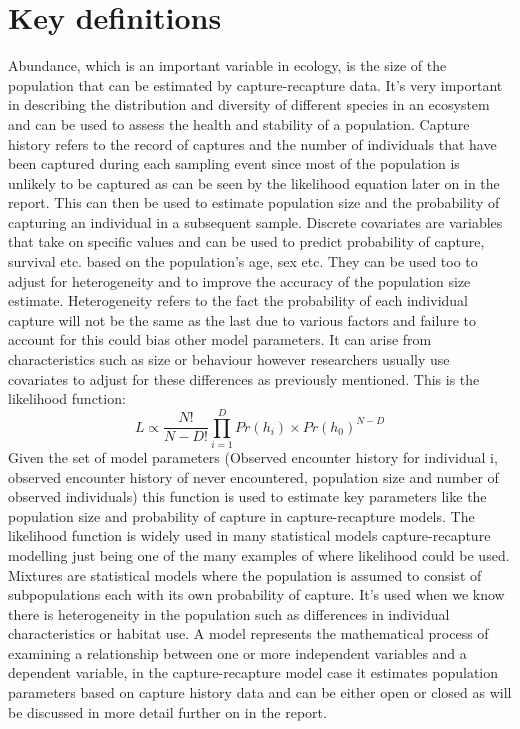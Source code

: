 \documentclass[,oneside]{article}
\numberwithin{equation}{section}
\begin{document}
\section{\large{Key definitions}} 
Abundance, which is an important variable in ecology, is the size of the population that can be estimated by capture-recapture data. It’s very important in describing the distribution and diversity of different species in an ecosystem and can be used to assess the health and stability of a population. Capture history refers to the record of captures and the number of individuals that have been captured during each sampling event since most of the population is unlikely to be captured as can be seen by the likelihood equation later on in the report. This can then be used to estimate population size and the probability of capturing an individual in a subsequent sample. Discrete covariates are variables that take on specific values and can be used to predict probability of capture, survival etc. based on the population's age, sex etc. They can be used too to adjust for heterogeneity and to improve the accuracy of the population size estimate. Heterogeneity refers to the fact the probability of each individual capture will not be the same as the last due to various factors and failure to account for this could bias other model parameters. It can arise from characteristics such as size or behaviour however researchers usually use covariates to adjust for these differences as previously mentioned. This is the likelihood function: \\
\begin{equation}
L\propto\frac{N!}{N-D!}\prod_{i=1}^{D}Pr(h_i)\times Pr(h_0)^{N-D}
\end{equation} 
Given the set of model parameters (Observed encounter history for individual i, observed encounter history of never encountered, population size and number of observed individuals) this function is used to estimate key parameters like the population size and probability of capture in capture-recapture models. The likelihood function is widely used in many statistical models capture-recapture modelling just being one of the many examples of where likelihood could be used. \\
Mixtures are statistical models where the population is assumed to consist of subpopulations each with its own probability of capture. It’s used when we know there is heterogeneity in the population such as differences in individual characteristics or habitat use. A model represents the mathematical process of examining a relationship between one or more independent variables and a dependent variable, in the capture-recapture model case it estimates population parameters based on capture history data and can be either open or closed as will be discussed in more detail further on in the report. 
 
\end{document}

